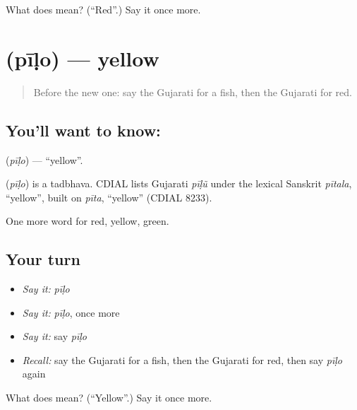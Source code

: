 \begin{tcolorbox}[breakable,colback=teal!4,colframe=teal!35!black,title={Before you move on}]
What does  mean? (\textquotedblleft{}Red\textquotedblright{}.) Say it once more.
\end{tcolorbox}
\section[\texorpdfstring{\gu{પીળો} (pīḷo)}{પીળો (pīḷo)}]{ (pīḷo) — yellow}

\label{lesson:GU-C70-yellow}



\begin{quote}
Before the new one: say the Gujarati for a fish, then the Gujarati for red.
\end{quote}

\subsection*{You'll want to know: }
\textbf{} (\emph{pīḷo}) — \textquotedblleft{}yellow\textquotedblright{}.

\begin{cousinweb}
\textbf{} (\emph{pīḷo}) is a tadbhava. CDIAL lists Gujarati \emph{pīḷũ} under the lexical Sanskrit \emph{pītala}, \textquotedblleft{}yellow\textquotedblright{}, built on \emph{pīta}, \textquotedblleft{}yellow\textquotedblright{} (CDIAL 8233).
\end{cousinweb}

\begin{grammarlens}[title={What you've built}]
One more word for red, yellow, green.
\end{grammarlens}

\subsection*{Your turn}
\begin{itemize}
\raggedright
  \item \emph{Say it:} \emph{pīḷo}
  \item \emph{Say it:} \emph{pīḷo}, once more
  \item \emph{Say it:} say \emph{pīḷo}
  \item \emph{Recall:} say the Gujarati for a fish, then the Gujarati for red, then say \emph{pīḷo} again
\end{itemize}

\begin{tcolorbox}[breakable,colback=teal!4,colframe=teal!35!black,title={Before you move on}]
What does  mean? (\textquotedblleft{}Yellow\textquotedblright{}.) Say it once more.
\end{tcolorbox}
